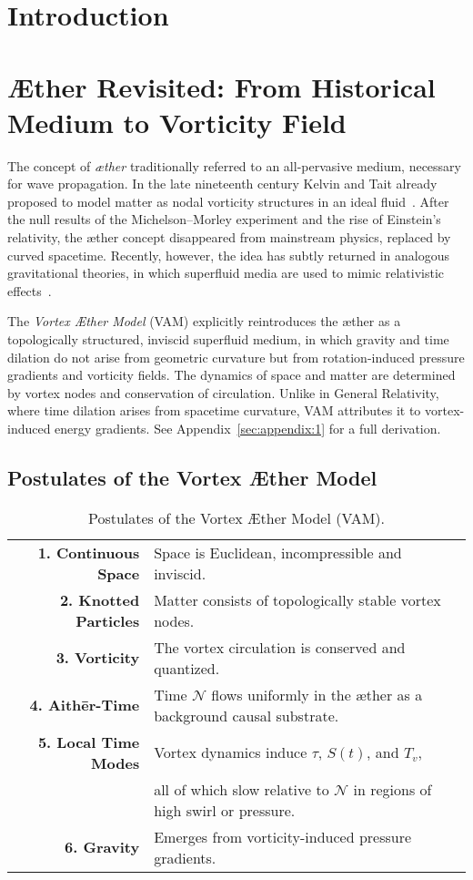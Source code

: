 \section*{Introduction}
\section*{Æther Revisited: From Historical Medium to Vorticity Field}

The concept of \textit{æther} traditionally referred to an all-pervasive medium, necessary for wave propagation. In the late nineteenth century Kelvin and Tait already proposed to model matter as nodal vorticity structures in an ideal fluid~\cite{thomson1867treatise}. After the null results of the Michelson--Morley experiment and the rise of Einstein's relativity, the æther concept disappeared from mainstream physics, replaced by curved spacetime. Recently, however, the idea has subtly returned in analogous gravitational theories, in which superfluid media are used to mimic relativistic effects~\cite{barcelo2011analogue, volovik2009universe}.

The \textit{Vortex Æther Model} (VAM) explicitly reintroduces the æther as a topologically structured, inviscid superfluid medium, in which gravity and time dilation do not arise from geometric curvature but from rotation-induced pressure gradients and vorticity fields. The dynamics of space and matter are determined by vortex nodes and conservation of circulation. Unlike in General Relativity, where time dilation arises from spacetime curvature, VAM attributes it to vortex-induced energy gradients. See Appendix~\ref{sec:appendix:1} for a full derivation.


\subsection*{Postulates of the Vortex Æther Model}

\begin{table}[h!]
    \centering
    \begin{tabular}{rl}
        \midrule
        \hline
        \textbf{1. Continuous Space} & Space is Euclidean, incompressible and inviscid. \\
        \textbf{2. Knotted Particles} & Matter consists of topologically stable vortex nodes. \\
        \textbf{3. Vorticity} & The vortex circulation is conserved and quantized. \\
        \textbf{4. Aithēr-Time} & Time $\mathcal{N}$ flows uniformly in the æther as a background causal substrate. \\
        \textbf{5. Local Time Modes} & Vortex dynamics induce $\tau$, $S(t)$, and $T_v$,\\ & all of which slow relative to $\mathcal{N}$ in regions of high swirl or pressure. \\
        \textbf{6. Gravity} & Emerges from vorticity-induced pressure gradients. \\
        \hline
        \bottomrule
    \end{tabular}
    \caption{Postulates of the Vortex Æther Model (VAM).}
    \label{tab:postulates}
\end{table}

